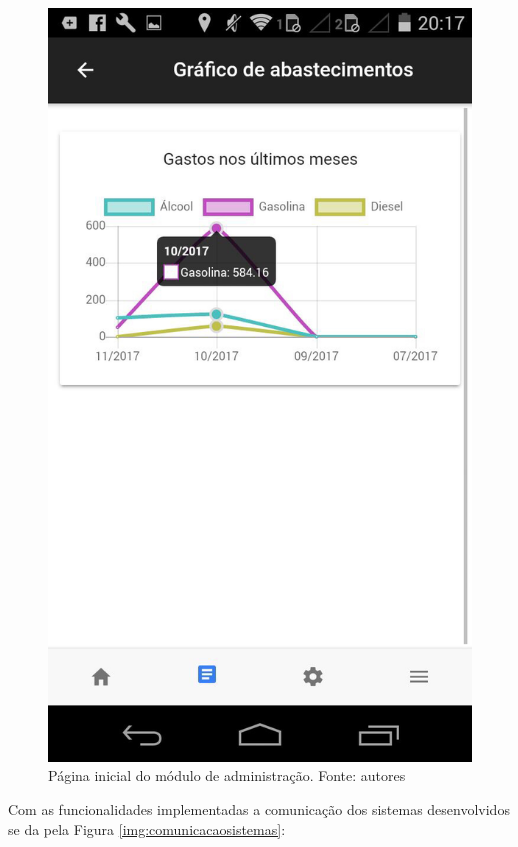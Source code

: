 \begin{figure}[H]
    \centering
    \includegraphics[scale=0.3]{figuras/grafico-app.jpg}
    \caption[Página inicial do módulo de administração]{Página inicial do módulo de administração. Fonte: autores}
    \label{img:grafico-app}
\end{figure}

Com as funcionalidades implementadas a comunicação dos sistemas desenvolvidos se da pela Figura \ref{img:comunicacaosistemas}:

